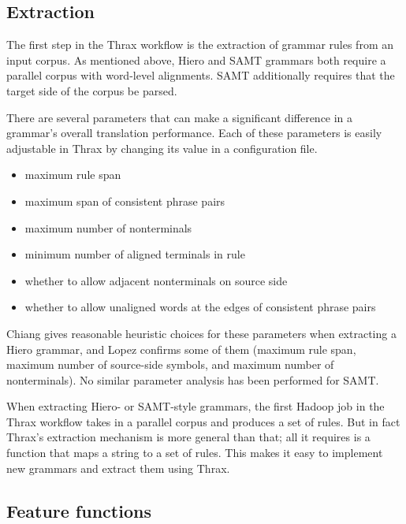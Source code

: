 \documentclass[11pt]{article}
\begin{document}
\subsection{Extraction}

The first step in the Thrax workflow is the extraction of grammar rules from an input corpus. As mentioned above, Hiero and SAMT grammars both require a parallel corpus with word-level alignments. SAMT additionally requires that the target side of the corpus be parsed.

There are several parameters that can make a significant difference in a grammar's overall translation performance. Each of these parameters is easily adjustable in Thrax by changing its value in a configuration file.
\begin{itemize}
\item maximum rule span
\item maximum span of consistent phrase pairs
\item maximum number of nonterminals
\item minimum number of aligned terminals in rule
\item whether to allow adjacent nonterminals on source side
\item whether to allow unaligned words at the edges of consistent phrase pairs
\end{itemize}

Chiang  gives reasonable heuristic choices for these parameters when extracting a Hiero grammar, and Lopez  confirms some of them (maximum rule span, maximum number of source-side symbols, and maximum number of nonterminals). No similar parameter analysis has been performed for SAMT.

When extracting Hiero- or SAMT-style grammars, the first Hadoop job in the Thrax workflow takes in a parallel corpus and produces a set of rules. But in fact Thrax's extraction mechanism is more general than that; all it requires is a function that maps a string to a set of rules. This makes it easy to implement new grammars and extract them using Thrax.

\subsection{Feature functions}
\label{features}
\end{document}
